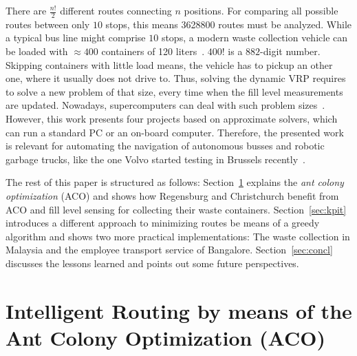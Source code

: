\documentclass[10pt]{article}
\begin{document}
There are $\frac{n!}{2}$ different routes connecting $n$ positions. 
For comparing all possible routes between only $10$ stops, this means 
3628800 routes must be analyzed. While a typical bus line might 
comprise $10$ stops, a modern waste collection
vehicle can be loaded with $\approx 400$ containers of 120 
liters~\cite{hyundai18}.
$400!$ is a $882$-digit number. 
Skipping 
containers with little load means, the vehicle has to pickup an other
one, where it usually does not drive to. Thus, solving the dynamic VRP 
requires to solve a new problem of that size, every time when the fill level
measurements are updated. Nowadays, supercomputers can deal with 
such problem sizes~\cite{Burkhovetskiy2017}. However, this work 
presents four projects based on approximate solvers, which
can run a standard PC or an on-board computer. %
Therefore, the presented work is relevant 
for automating the navigation of autonomous busses and robotic garbage 
trucks, like the one Volvo started testing in Brussels 
recently~\cite{volvo17}.


The rest of this paper is structured as follows: 
Section~\ref{sec:aco} explains the {\it ant colony optimization} (ACO)
and shows how %
Regensburg 
and Christchurch benefit from ACO and fill level sensing for collecting 
their waste containers. 
Section~\ref{sec:kpit} introduces a different approach to minimizing routes
be means of a greedy algorithm and shows two more practical implementations:
The waste collection in Malaysia and the employee transport service of 
Bangalore.
Section~\ref{sec:concl} %
discusses the lessons learned %
and points out some future perspectives.

\section{Intelligent Routing by means of the Ant Colony Optimization (ACO)}
\label{sec:aco}
\end{document}
